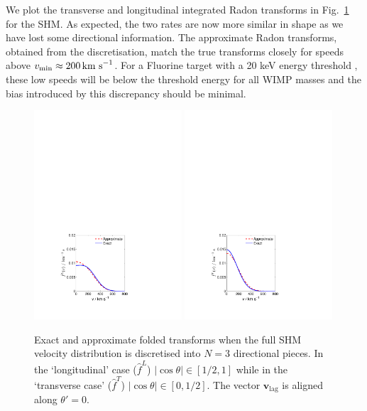 We plot the transverse and longitudinal integrated Radon transforms in Fig.~\ref{fig:directional:radonN3folded} for the SHM. As expected, the two rates are now more similar in shape as we have lost some directional information. The approximate Radon transforms, obtained from the discretisation, match the true transforms closely for speeds above $\vmin\approx 200 \kms$. For a Fluorine target with a 20 keV energy threshold \cite{Daw:2011}, these low speeds will be below the threshold energy for all WIMP masses and the bias introduced by this discrepancy should be minimal. 

\begin{figure}[t]

  \centering

  \includegraphics[trim={3.5cm 2cm 7.5cm 17cm},clip,width=0.49\textwidth]{Directional/SHMfolded_N3_L.pdf}
  \includegraphics[trim={3.5cm 2cm 7.5cm 17cm},clip,width=0.49\textwidth]{Directional/SHMfolded_N3_T.pdf}

\caption[Exact and approximate folded Radon transforms for $N=3$ components in the SHM]{Exact and approximate folded transforms when the full SHM velocity distribution is discretised into $N = 3$ directional pieces. In the `longitudinal' case ($\hat{f}^L$) $|\cos\theta| \in [1/2,1]$ while in the `transverse case' ($\hat{f}^T$) $|\cos\theta| \in [0, 1/2]$. The vector $\textbf{v}_\textrm{lag}$ is aligned along $\theta' = 0$.}
\label{fig:directional:radonN3folded}
\end{figure}

